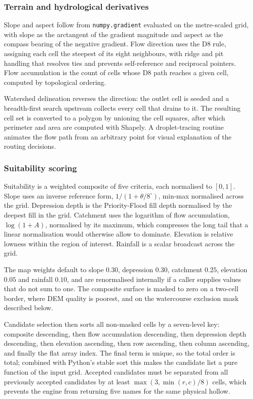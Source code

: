 \documentclass[sigconf,review,10pt]{acmart}
\begin{document}
\subsubsection{Terrain and hydrological derivatives}

Slope and aspect follow from \texttt{numpy.gradient} evaluated on the
metre-scaled grid, with slope as the arctangent of the gradient magnitude
and aspect as the compass bearing of the negative gradient. Flow
direction uses the D8 rule, assigning each cell the steepest of its eight
neighbours, with ridge and pit handling that resolves ties and prevents
self-reference and reciprocal pointers. Flow accumulation is the count of
cells whose D8 path reaches a given cell, computed by topological
ordering.

Watershed delineation reverses the direction: the outlet cell is seeded
and a breadth-first search upstream collects every cell that drains to it.
The resulting cell set is converted to a polygon by unioning the cell
squares, after which perimeter and area are computed with Shapely. A
droplet-tracing routine animates the flow path from an arbitrary point for
visual explanation of the routing decisions.

\subsubsection{Suitability scoring}
\label{sec:suitability}

Suitability is a weighted composite of five criteria, each normalised to
$[0,1]$. Slope uses an inverse reference form, $1/(1+\theta/8^\circ)$,
min-max normalised across the grid. Depression depth is the Priority-Flood
fill depth normalised by the deepest fill in the grid. Catchment uses the
logarithm of flow accumulation, $\log(1+A)$, normalised by its maximum,
which compresses the long tail that a linear normalisation would
otherwise allow to dominate. Elevation is relative lowness within the
region of interest. Rainfall is a scalar broadcast across the grid.

The map weights default to slope $0.30$, depression $0.30$, catchment
$0.25$, elevation $0.05$ and rainfall $0.10$, and are renormalised
internally if a caller supplies values that do not sum to one. The
composite surface is masked to zero on a two-cell border, where DEM
quality is poorest, and on the watercourse exclusion mask described below.

Candidate selection then sorts all non-masked cells by a seven-level key:
composite descending, then flow accumulation descending, then depression
depth descending, then elevation ascending, then row ascending, then
column ascending, and finally the flat array index. The final term is
unique, so the total order is total; combined with Python's stable sort
this makes the candidate list a pure function of the input grid. Accepted
candidates must be separated from all previously accepted candidates by at
least $\max(3, \min(r,c)/8)$ cells, which prevents the engine from
returning five names for the same physical hollow.
\end{document}
